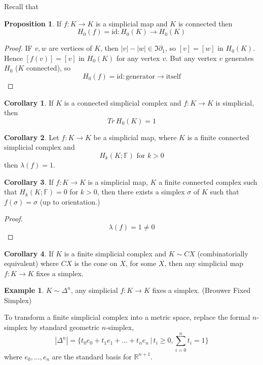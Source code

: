 \documentclass[a4paper,14pt]{extarticle}
\theoremstyle{definition}
\newtheorem*{corollary}{Corollary}
\newtheorem*{proposition}{Proposition}
\newtheorem*{eg}{Example}
\begin{document}
Recall that 
\begin{proposition}
	If $f:K\rightarrow K$ is a simplicial map and $K$ is connected then 
	\[H_0(f)=\text{id}:H_0(K)\rightarrow H_0(K)\]
\end{proposition}

\begin{proof}
	IF $v,w$ are vertices of $K$, then $|v|-|w|\in\Im\partial_1$, so 
	$[v]=[w]$ in $H_0(K)$. Hence $[f(v)]=[v]$ in $H_0(K)$ for any vertex $v$. But any 
	vertex $v$ generates $H_0$ ($K$ connected), so 
	\[H_0(f)=\text{id}:\text{generator}\rightarrow\text{itself}\]
\end{proof}

\begin{corollary}
	If $K$ is a connected simplicial complex and $f:K\rightarrow K$ is simplicial, then 
	\[Tr \,H_0(K)=1\]
\end{corollary}

\begin{corollary}
	Let $f:K\rightarrow K$ be a simplicial map, where $K$ is a finite connected simplicial 
	complex and \[H_k(K;\mathbb{F})\text{ for }k>0\] then $\lambda(f)=1$.
\end{corollary}

\begin{corollary}
	If $f:K\rightarrow K$ is a simplicial map, $K$ a finite connected complex such that 
	$H_k(K;\mathbb{F})=0$ for $k>0$, then there exists a simplex $\sigma$ of $K$ such that 
	$f(\sigma)=\sigma$ (up to orientation.)
\end{corollary}

\begin{proof}
	\[\lambda(f)=1\neq0\]
\end{proof}

\begin{corollary}
	If $K$ is a finite simplicial complex and $K\sim CX$ (combinatorially equivalent) where 
	$CX$ is the cone on $X$, for some $X$, then any simplicial map $f:K\rightarrow K$ fixes
	a simplex.
\end{corollary}

\begin{eg}
	$K\sim \Delta^n$, any simplicial $f:K\rightarrow K$ fixes a simplex. (Brouwer Fixed Simplex)
\end{eg}

To transform a finite simplicial complex into a metric space, replace the 
formal $n$-simplex by standard geometric $n$-simplex, 
\[|\Delta^n|=\{t_0 e_0 + t_1 e_1 + \ldots + t_n e_n\,|\,t_i\geq 0, \sum_{i=0}^n t_i = 1\}\]
where $e_0, \ldots, e_n$ are the standard basis for $\mathbb{R}^{n+1}$. \\
\end{document}
